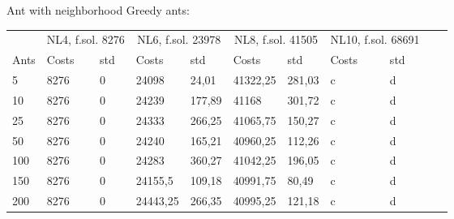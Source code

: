 \newline
Ant with neighborhood Greedy ants:
\newline
\begin{minipage}[b]{1.0\textwidth}
    \begin{tabular}{ l | ll | ll | ll | ll | ll}
	\hline
	& \multicolumn{2}{c}{NL4, f.sol. 8276} & \multicolumn{2}{c}{NL6, f.sol. 23978}
	& \multicolumn{2}{c}{NL8, f.sol. 41505} & \multicolumn{2}{c}{NL10, f.sol. 68691} \\
	\cline{1-5}
	Ants & Costs & std & Costs & std & Costs & std & Costs & std \\
	\hline
	5     &  8276  & 0 &    24098   & 24,01  &  41322,25    & 281,03 &  c    & d \\
	10    &  8276  & 0 &    24239   & 177,89 &  41168       & 301,72 &  c    & d \\
	25    &  8276  & 0 &    24333   & 266,25 &  41065,75    & 150,27 &  c    & d \\
	50    &  8276  & 0 &    24240   & 165,21 &  40960,25    & 112,26 &  c    & d \\
	100   &  8276  & 0 &    24283   & 360,27 &  41042,25    & 196,05 &  c    & d \\
	150   &  8276  & 0 &  24155,5   & 109,18 &  40991,75    & 80,49  &  c    & d \\
	200   &  8276  & 0 &  24443,25  & 266,35 &  40995,25    & 121,18 &  c    & d
	\\
	\hline
	\end{tabular}
\end{minipage}
